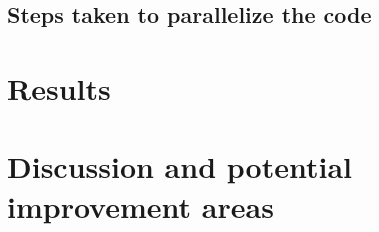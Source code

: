 \documentclass[paper=a4, fontsize=11pt]{scrartcl}
\numberwithin{equation}{section}		%
\numberwithin{figure}{section}			%
\numberwithin{table}{section}				%
\begin{document}
\subsection{Steps taken to parallelize the code}

\section{Results}



\section{Discussion and potential improvement areas}





\printbibliography[heading=bibintoc]


\end{document}
